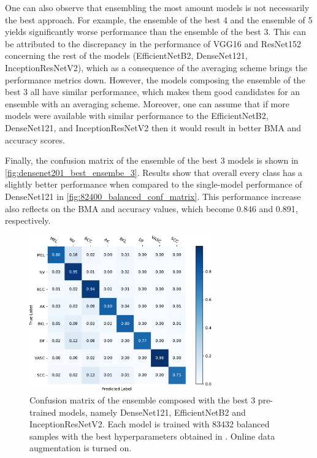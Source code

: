     One can also observe that ensembling the most amount models is not necessarily the best approach. For example, the ensemble of the best 4 and the ensemble of 5 yields significantly worse performance than the ensemble of the best 3. This can be attributed to the discrepancy in the performance of VGG16 and ResNet152 concerning the rest of the models (EfficientNetB2, DenseNet121, InceptionResNetV2), which as a consequence of the averaging scheme brings the performance metrics down. However, the models composing the ensemble of the best 3 all have similar performance, which makes them good candidates for an ensemble with an averaging scheme. Moreover, one can assume that if more models were available with similar performance to the EfficientNetB2, DenseNet121, and InceptionResNetV2 then it would result in better \ac{BMA} and accuracy scores. 
    
    Finally, the confusion matrix of the ensemble of the best 3 models is shown in \autoref{fig:densenet201_best_ensembe_3}. Results show that overall every class has a slightly better performance when compared to the single-model performance of DenseNet121 in \autoref{fig:82400_balanced_conf_matrix}. This performance increase also reflects on the \ac{BMA} and accuracy values, which become 0.846 and 0.891, respectively.\par
    
    \begin{figure}[ht]
        \centering
        \includegraphics[width=0.7\textwidth]{figs/densenet201_best_ensembe_3.pdf}
        \caption[Confusion matrix of the ensemble composed with the best 3 pre-trained models.]{Confusion matrix of the ensemble composed with the best 3 pre-trained models, namely DenseNet121, EfficientNetB2 and InceptionResNetV2. Each model is trained with 83432 balanced samples with the best hyperparameters obtained in . Online data augmentation is turned on.}
        \label{fig:densenet201_best_ensembe_3}
    \end{figure}



